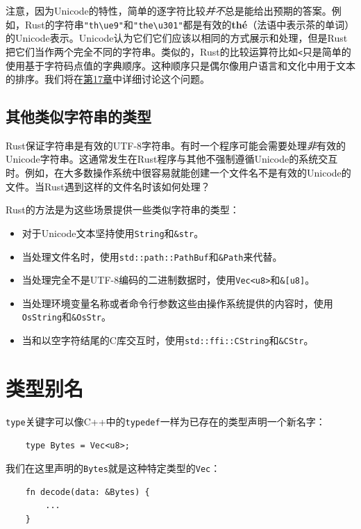 注意，因为Unicode的特性，简单的逐字符比较\emph{并不}总是能给出预期的答案。例如，Rust的字符串\texttt{"th\textbackslash u{e9}"}和\texttt{"the\textbackslash u{301}"}都是有效的\textbf{thé}（法语中表示茶的单词）的Unicode表示。Unicode认为它们它们应该以相同的方式展示和处理，但是Rust把它们当作两个完全不同的字符串。类似的，Rust的比较运算符比如\texttt{<}只是简单的使用基于字符码点值的字典顺序。这种顺序只是偶尔像用户语言和文化中用于文本的排序。我们将在\hyperref[ch17]{第17章}中详细讨论这个问题。

\subsection{其他类似字符串的类型}

Rust保证字符串是有效的UTF-8字符串。有时一个程序可能会需要处理\emph{非}有效的Unicode字符串。这通常发生在Rust程序与其他不强制遵循Unicode的系统交互时。例如，在大多数操作系统中很容易就能创建一个文件名不是有效的Unicode的文件。当Rust遇到这样的文件名时该如何处理？

Rust的方法是为这些场景提供一些类似字符串的类型：
\begin{itemize}
    \item 对于Unicode文本坚持使用\texttt{String}和\texttt{\&str}。
    \item 当处理文件名时，使用\texttt{std::path::PathBuf}和\texttt{\&Path}来代替。
    \item 当处理完全不是UTF-8编码的二进制数据时，使用\texttt{Vec<u8>}和\texttt{\&[u8]}。
    \item 当处理环境变量名称或者命令行参数这些由操作系统提供的内容时，使用\texttt{OsString}和\texttt{\&OsStr}。
    \item 当和以空字符结尾的C库交互时，使用\texttt{std::ffi::CString}和\texttt{\&CStr}。
\end{itemize}

\section{类型别名}

\texttt{type}关键字可以像C++中的\texttt{typedef}一样为已存在的类型声明一个新名字：
\begin{verbatim}
    type Bytes = Vec<u8>;
\end{verbatim}

我们在这里声明的\texttt{Bytes}就是这种特定类型的\texttt{Vec}：
\begin{verbatim}
    fn decode(data: &Bytes) {
        ...
    }
\end{verbatim}


